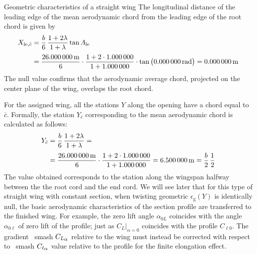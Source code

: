 \documentclass[[12pt,twoside]{book}
\begin{document}
\begin{myExampleX}{Geometric characteristics of a straight wing}{}
\noindent
The longitudinal distance of the leading edge of the mean aerodynamic chord from the
leading edge of the root chord is given by
\[
\begin{split}
X_{\mathrm{le},\bar{c}} 
  & {}=
    \frac{b}{6} \, \frac{1+2\lambda}{1+\lambda} \tan\Lambda_\mathrm{le} \\[3pt]
  & {}=
    \frac{\SI[round-precision=1]{\mySpanWingMT}{\metre}}{6}
      \cdot 
      \frac{
        1 + 2\cdot\SI[round-precision=0]{\myTaperRatioWing}{}
      }{
        1 + \SI[round-precision=0]{\myTaperRatioWing}{}
      }
      \cdot \tan \big( \SI[round-precision=0]{\myLambdaLERad}{\radian} \big)
    = { \SI[round-precision=0]{\myXLEMACWingMT}{\metre} }%
\end{split}
\]
The null value confirms that the aerodynamic average chord, projected on the center plane
of the wing, overlaps the root chord.

\noindent
For the assigned wing, all the stations $ Y $ along the opening have a chord equal to $ \bar{c} $.
Formally, the station $ Y _ {\bar{c}} $ corresponding to the mean aerodynamic chord
is calculated as follows:
\[
\begin{split}
Y_{\bar{c}} 
  & {}=
    \frac{b}{6} \, \frac{1+2\lambda}{1+\lambda} = \\[3pt]
  & {}=
    \frac{\SI[round-precision=1]{\mySpanWingMT}{\metre}}{6}
      \cdot 
      \frac{
        1 + 2\cdot\SI[round-precision=2]{\myTaperRatioWing}{}
      }{
        1 + \SI[round-precision=2]{\myTaperRatioWing}{}
      }
    = { \SI[round-precision=2]{\myYMACWingMT}{\metre} }
    = \frac{b}{2} \, \frac{1}{2}
\end{split}
\]
The value obtained corresponds to the station along the wingspan halfway between the
the root cord and the end cord.
We will see later that for this type of straight wing with constant section, when twisting
geometric $ \epsilon_\mathrm {g} (Y) $ is identically null,
the basic aerodynamic characteristics of the section profile are transferred to the finished wing.
For example, the zero lift angle $\alpha_ {0L} $ coincides with the angle $ \alpha_ {0 \ell} $
of zero lift of the profile; just as $ C_L \big | _ {\alpha = 0} $ coincides with the profile $ C _ {\ell 0} $.
The gradient \ smash {$ C_ {L_ \mathlarger {\alpha}} $} relative to the wing must instead be corrected with respect to
\ smash {$ C _ {\ell_ \mathlarger {\alpha}} $} value relative to the profile for the finite elongation effect.

\end{myExampleX}
\end{document}
